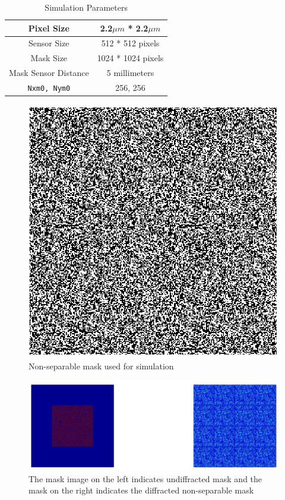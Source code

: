 \begin{table}
\caption{Simulation Parameters}
\begin{center}
\begin{tabular}{ |c|c| }
\hline
Pixel Size & 2.2$\mu m$ * 2.2$\mu m$\\
\hline
Sensor Size & 512 * 512 pixels\\
\hline     
Mask Size & 1024 * 1024 pixels\\
\hline 
Mask Sensor Distance & 5 millimeters \\
\hline 
\texttt{Nxm0, Nym0} & 256, 256\\
\hline
\end{tabular}
\label{tbl:sim_parameters}
\end{center}
\end{table}

\begin{figure}[ht]
\centering
\includegraphics[scale = 0.250]{pics/non_separable_mask}
\caption{Non-separable mask used for simulation}
\label{fig:non_sep_sim}
\end{figure}

\begin{figure}[ht]
\centering
\includegraphics[width = \textwidth]{pics/non_sep_diffracted_mask}
\caption{The mask image on the left indicates undiffracted mask and the mask on the right indicates the diffracted non-separable mask}
\label{fig:non_sep_sim_diff}
\end{figure}

